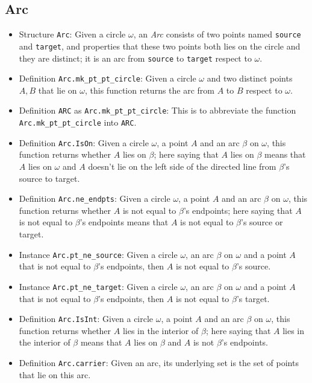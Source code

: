 \documentclass[12pt]{amsart}
\begin{document}
\subsection{Arc}
\begin{itemize}
    \item Structure \verb|Arc|: Given a circle $\omega$, an \emph{Arc} consists of two points named \verb|source| and \verb|target|, and properties that these two points both lies on the circle and they are distinct; it is an arc from \verb|source| to \verb|target| respect to $\omega$.
    \item Definition \verb|Arc.mk_pt_pt_circle|: Given a circle $\omega$ and two distinct points $A,B$ that lie on $\omega$, this function returns the arc from $A$ to $B$ respect to $\omega$.
    \item Definition \verb|ARC| as \verb|Arc.mk_pt_pt_circle|: This is to abbreviate the function \verb|Arc.mk_pt_pt_circle| into \verb|ARC|.
    \item Definition \verb|Arc.IsOn|: Given a circle $\omega$, a point $A$ and an arc $\beta$ on $\omega$, this function returns whether $A$ lies on $\beta$; here saying that $A$ lies on $\beta$ means that $A$ lies on $\omega$ and $A$ doesn't lie on the left side of the directed line from $\beta$'s source to target.
    \item Definition \verb|Arc.ne_endpts|: Given a circle $\omega$, a point $A$ and an arc $\beta$ on $\omega$, this function returns whether $A$ is not equal to $\beta$'s endpoints; here saying that $A$ is not equal to $\beta$'s endpoints means that $A$ is not equal to $\beta$'s source or target.
    \item Instance \verb|Arc.pt_ne_source|: Given a circle $\omega$, an arc $\beta$ on $\omega$ and a point $A$ that is not equal to $\beta$'s endpoints, then $A$ is not equal to $\beta$'s source.
    \item Instance \verb|Arc.pt_ne_target|: Given a circle $\omega$, an arc $\beta$ on $\omega$ and a point $A$ that is not equal to $\beta$'s endpoints, then $A$ is not equal to $\beta$'s target.
    \item Definition \verb|Arc.IsInt|: Given a circle $\omega$, a point $A$ and an arc $\beta$ on $\omega$, this function returns whether $A$ lies in the interior of $\beta$; here saying that $A$ lies in the interior of $\beta$ means that $A$ lies on $\beta$ and $A$ is not $\beta$'s endpoints.
    \item Definition \verb|Arc.carrier|: Given an arc, its underlying set is the set of points that lie on this arc.

\end{itemize}
\end{document}
